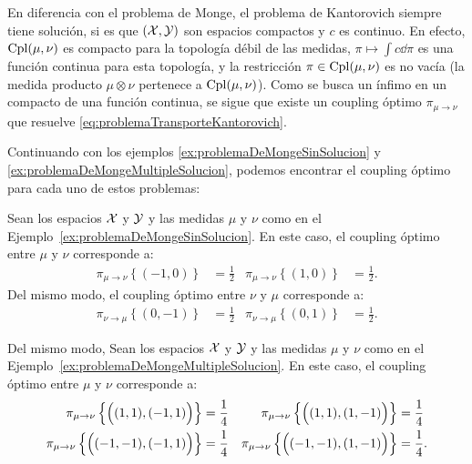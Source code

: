 En diferencia con el problema de Monge, el problema de Kantorovich siempre tiene solución, si es que $(\mathcal{X}, \mathcal{Y})$ son espacios compactos y $c$ es continuo. En efecto, $\operatorname{Cpl}(\mu, \nu)$ es compacto para la topología débil de las medidas,  $\pi \mapsto \int c\dd{\pi}$ es una función continua para esta topología, y la restricción $\pi\in\operatorname{Cpl}(\mu, \nu)$ es no vacía (la medida producto $\mu \otimes \nu$ pertenece a $\operatorname{Cpl}(\mu, \nu)$). Como se busca un ínfimo en un compacto de una función continua, se sigue que existe un coupling óptimo $\pi_{\mu \to \nu}$ que resuelve \eqref{eq:problemaTransporteKantorovich}.

Continuando con los ejemplos \ref*{ex:problemaDeMongeSinSolucion} y \ref*{ex:problemaDeMongeMultipleSolucion}, podemos encontrar el coupling óptimo para cada uno de estos problemas:

\begin{example}
	Sean los espacios $\mathcal{X}$ y $\mathcal{Y}$ y las medidas $\mu$ y $\nu$ como en el Ejemplo~\ref*{ex:problemaDeMongeSinSolucion}. En este caso, el coupling óptimo entre $\mu$ y $\nu$ corresponde a:
	\begin{align*}
		\pi_{\mu \to \nu}\left\{ (-1, 0) \right\} & = \frac{1}{2} & \pi_{\mu \to \nu}\left\{ (1, 0) \right\} & = \frac{1}{2}.
	\end{align*}
	Del mismo modo, el coupling óptimo entre $\nu$ y $\mu$ corresponde a:
	\begin{align*}
		\pi_{\nu \to \mu}\left\{ (0, -1) \right\} & = \frac{1}{2} & \pi_{\nu \to \mu}\left\{ (0, 1) \right\} & = \frac{1}{2}.
	\end{align*}

\end{example}

\begin{example}
	Del mismo modo, Sean los espacios $\mathcal{X}$ y $\mathcal{Y}$ y las medidas $\mu$ y $\nu$ como en el Ejemplo~\ref*{ex:problemaDeMongeMultipleSolucion}. En este caso, el coupling óptimo entre $\mu$ y $\nu$ corresponde a:
	\begin{align*}
		\pi_{\mu \to \nu}\left\{ \qty\Big((1, 1), (-1, 1)) \right\}   & = \frac{1}{4} & \pi_{\mu \to \nu}\left\{ \qty\Big((1, 1), (1, -1)) \right\}   & = \frac{1}{4}  \\
		\pi_{\mu \to \nu}\left\{ \qty\Big((-1, -1), (-1, 1)) \right\} & = \frac{1}{4} & \pi_{\mu \to \nu}\left\{ \qty\Big((-1, -1), (1, -1)) \right\} & = \frac{1}{4}.
	\end{align*}

\end{example}

